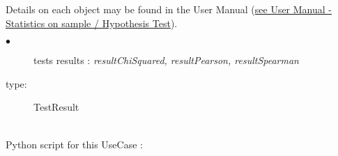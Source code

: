 Details on each object may be found in the User Manual  (\href{OpenTURNS_UserManual_TUI.pdf}{see User Manual - Statistics on sample /  Hypothesis Test}).\\



{
  \begin{description}
  \item[$\bullet$] tests results : {\itshape resultChiSquared, resultPearson, resultSpearman}
  \item[type:] TestResult
  \end{description}
}

\textspace\\
Python script for this UseCase :

